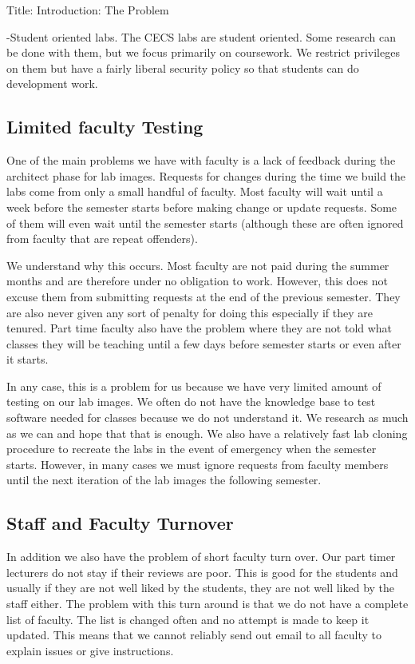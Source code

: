 
Title: Introduction: The Problem

-Student oriented labs.
The CECS labs are student oriented.  Some research can be done with them, but we focus primarily on coursework.  We restrict privileges on them but have a fairly liberal security policy so that students can do development work. 

\subsection{Limited faculty Testing}
One of the main problems we have with faculty is a lack of feedback during the architect phase for lab images.  Requests for changes during the time we build the labs come from only a small handful of faculty.  Most faculty will wait until a week before the semester starts before making change or update requests.  Some of them will even wait until the semester starts (although these are often ignored from faculty that are repeat offenders).  

We understand why this occurs.  Most faculty are not paid during the summer months and are therefore under no obligation to work.  However, this does not excuse them from submitting requests at the end of the previous semester.  They are also never given any sort of penalty for doing this especially if they are tenured.  Part time faculty also have the problem where they are not told what classes they will be teaching until a few days before semester starts or even after it starts.  

In any case, this is a problem for us because we have very limited amount of testing on our lab images.  We often do not have the knowledge base to test software needed for classes because we do not understand it.  We research as much as we can and hope that that is enough.  We also have a relatively fast lab cloning procedure to recreate the labs in the event of emergency when the semester starts.  However, in many cases we must ignore requests from faculty members until the next iteration of the lab images the following semester.

\subsection{Staff and Faculty Turnover}
In addition we also have the problem of short faculty turn over.  Our part timer lecturers do not stay if their reviews are poor.  This is good for the students and usually if they are not well liked by the students, they are not well liked by the staff either.  The problem with this turn around is that we do not have a complete list of faculty.  The list is changed often and no attempt is made to keep it updated.  This means that we cannot reliably send out email to all faculty to explain issues or give instructions.  

